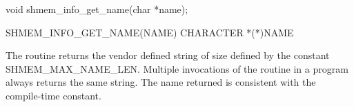 \synC   %

void shmem_info_get_name(char *name); %

\synF   %

SHMEM_INFO_GET_NAME(NAME)   
CHARACTER *(*)NAME %

{
  The routine returns the vendor defined string of size defined by the 
  constant SHMEM\_MAX\_NAME\_LEN. Multiple invocations of the 
  routine in a \openshmem{} program always returns the same string. 
  \cbstart The name returned is consistent with the compile-time constant. \cbend
}
{
}
\eAPI

